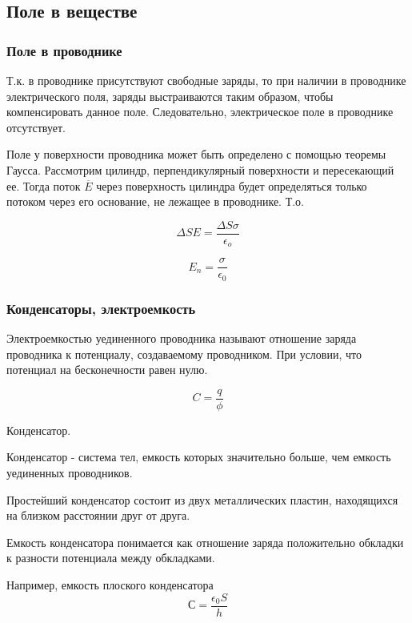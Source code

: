 \subsection{Поле в веществе}

\subsubsection{Поле в проводнике}


Т.к. в проводнике присутствуют свободные заряды, то при наличии в проводнике электрического поля, заряды выстраиваются таким образом, чтобы компенсировать данное поле.
Следовательно, электрическое поле в проводнике отсутствует.

Поле у поверхности проводника может быть определено с помощью теоремы Гаусса. Рассмотрим цилиндр, перпендикулярный поверхности и пересекающий ее. Тогда поток $\overline{E}$ через поверхность цилиндра будет определяться только потоком через его основание, не лежащее в проводнике. Т.о. 

\begin{equation}
\Delta S E = \frac{\Delta S \sigma}{\epsilon_o}
\end{equation}

\begin{equation}
E_n = \frac{\sigma}{\epsilon_0}
\end{equation}


\subsubsection{Конденсаторы, электроемкость}


Электроемкостью уединенного проводника называют отношение заряда проводника к потенциалу, создаваемому проводником. При условии, что потенциал на бесконечности равен нулю.

\begin{equation}
C=\frac{q}{\phi}
\end{equation}

Конденсатор.

Конденсатор - система тел, емкость которых значительно больше, чем емкость уединенных проводников.

Простейший конденсатор состоит из двух металлических пластин, находящихся на близком расстоянии друг от друга.

Емкость конденсатора понимается как отношение заряда положительно обкладки к разности потенциала между обкладками.

Например, емкость плоского конденсатора
\[С = \frac{\epsilon_0 S}{h}\]

